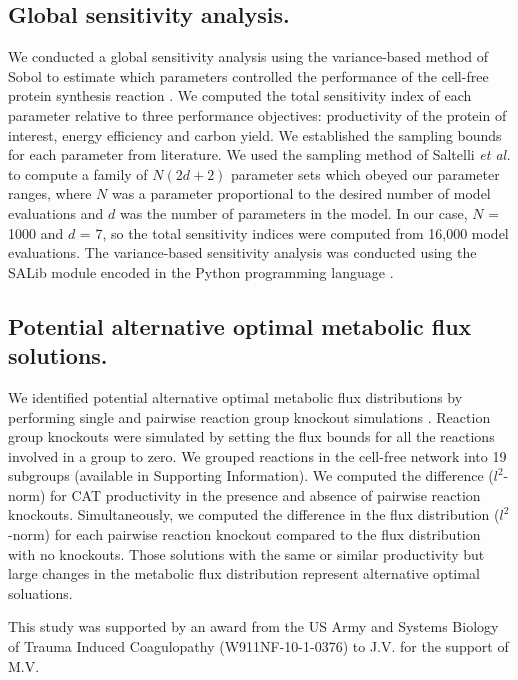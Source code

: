 \documentclass[journal=asbcd6,manuscript=article]{achemso}
\begin{document}
\subsection*{Global sensitivity analysis.}
We conducted a global sensitivity analysis using the variance-based method of Sobol to estimate which parameters controlled the performance of the cell-free protein synthesis reaction \citep{SOBOL_METHOD}.
We computed the total sensitivity index of each parameter relative to three performance objectives: productivity of the protein of interest, energy efficiency and carbon yield.
We established the sampling bounds for each parameter from literature.
We used the sampling method of Saltelli \textit{et al.} \citep{Saltelli:2010} to compute a family of $N\left(2d+2\right)$ parameter sets which obeyed our parameter ranges,
where $N$ was a parameter proportional to the desired number of model evaluations and $d$ was the number of parameters in the model. In our case, $N$ = 1000 and $d$ = 7, so the total sensitivity indices were computed from 16,000 model evaluations. The variance-based sensitivity analysis was conducted using the SALib module encoded in the Python programming language \citep{SALIB}.

\subsection*{Potential alternative optimal metabolic flux solutions.}
We identified potential alternative optimal metabolic flux distributions by performing single and pairwise reaction group knockout simulations \cite{Mahadevan2003264}.
Reaction group knockouts were simulated by setting the flux bounds for all the reactions involved in a group to zero.
We grouped reactions in the cell-free network into 19 subgroups (available in Supporting Information).
We computed the difference ($l^{2}$-norm) for CAT productivity in the presence and absence of pairwise reaction knockouts.
Simultaneously, we computed the difference in the flux distribution ($l^{2}$-norm) for each pairwise reaction knockout compared to the flux distribution with no knockouts.
Those solutions with the same or similar productivity but large changes in the metabolic flux distribution represent alternative optimal soluations.

\begin{acknowledgement}

This study was supported by an award from the US Army and Systems Biology of Trauma Induced Coagulopathy (W911NF-10-1-0376) to J.V. for the support of M.V.

\end{acknowledgement}
\end{document}
